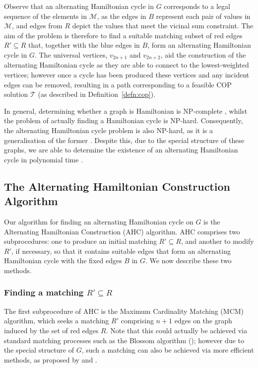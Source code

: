 \documentclass[authoryear]{elsarticle}
\begin{document}
\noindent Observe that an alternating Hamiltonian cycle in $G$ corresponds to a legal sequence of the elements in $\mathcal{M}$, as the edges in $B$ represent each pair of values in $\mathcal{M}$, and edges from $R$ depict the values that meet the vicinal sum constraint. The aim of the problem is therefore to find a suitable matching subset of red edges $R' \subseteq R$ that, together with the blue edges in $B$, form an alternating Hamiltonian cycle in $G$. The universal vertices, $v_{2n+1}$ and $v_{2n+2}$, aid the construction of the alternating Hamiltonian cycle as they are able to connect to the lowest-weighted vertices; however once a cycle has been produced these vertices and any incident edges can be removed, resulting in a path corresponding to a feasible COP solution $\mathcal{T}$ (as described in Definition~\ref{defn:cop}).

In general, determining whether a graph is Hamiltonian is NP-complete \citep{karp1972}, whilst the problem of actually finding a Hamiltonian cycle is NP-hard. Consequently, the alternating Hamiltonian cycle problem is also NP-hard, as it is a generalisation of the former \citep{haggkvist1977}. Despite this, due to the special structure of these graphs, we are able to determine the existence of an alternating Hamiltonian cycle in polynomial time \citep{hawa2018}. 

\subsection{The Alternating Hamiltonian Construction Algorithm}
\label{sub:ahc}
\noindent Our algorithm for finding an alternating Hamiltonian cycle on $G$ is the Alternating Hamiltonian Construction (AHC) algorithm. AHC comprises two subprocedures: one to produce an initial matching $R' \subseteq R$, and another to modify $R'$, if necessary, so that it contains suitable edges that form an alternating Hamiltonian cycle with the fixed edges $B$ in $G$. We now describe these two methods.

\subsubsection{Finding a matching $R' \subseteq R$}
\label{subsub:mcm}
\noindent The first subprocedure of AHC is the Maximum Cardinality Matching (MCM) algorithm, which seeks a matching $R'$ comprising $n+1$ edges on the graph induced by the set of red edges $R$. Note that this could actually be achieved via standard matching processes such as the Blossom algorithm (\cite{edmonds1965}); however due to the special structure of $G$, such a matching can also be achieved via more efficient methods, as proposed by \cite{mahadev1994} and \cite{becker2015}. 
\end{document}

